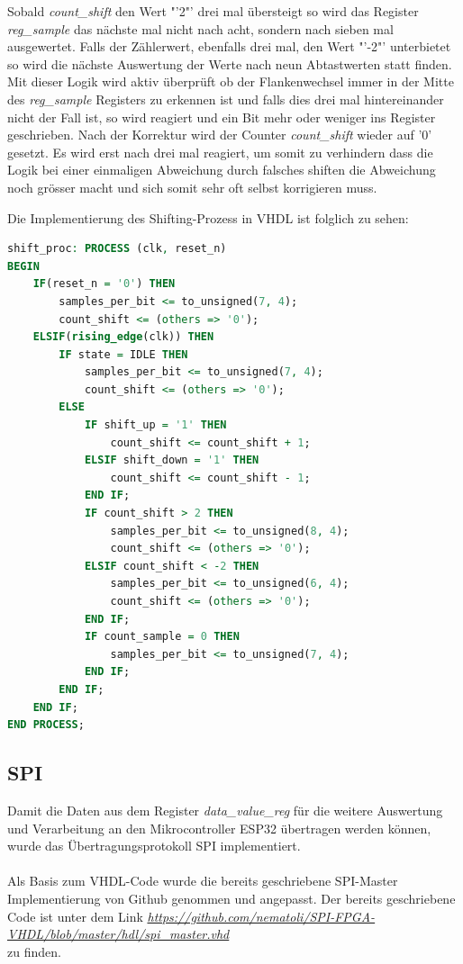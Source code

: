 Sobald \textit{count\_shift} den Wert "'2"' drei mal übersteigt so wird das Register \textit{reg\_sample} das nächste mal nicht nach acht, sondern nach sieben mal ausgewertet. Falls der Zählerwert, ebenfalls drei mal, den Wert "'-2"' unterbietet so wird die nächste Auswertung der Werte nach neun Abtastwerten statt finden. Mit dieser Logik wird aktiv überprüft ob der Flankenwechsel immer in der Mitte des \textit{reg\_sample} Registers zu erkennen ist und falls dies drei mal hintereinander nicht der Fall ist, so wird reagiert und ein Bit mehr oder weniger ins Register geschrieben.
Nach der Korrektur wird der Counter \textit{count\_shift} wieder auf '0' gesetzt. Es wird
erst nach drei mal reagiert, um somit zu verhindern dass die Logik bei einer einmaligen 
Abweichung durch falsches shiften die Abweichung noch grösser macht und sich somit sehr oft
selbst korrigieren muss.

\newpage
Die Implementierung des Shifting-Prozess in VHDL ist folglich zu sehen:

\begin{lstlisting}[language=vhdl]
shift_proc: PROCESS (clk, reset_n)
BEGIN		
	IF(reset_n = '0') THEN
		samples_per_bit <= to_unsigned(7, 4);
		count_shift <= (others => '0');
	ELSIF(rising_edge(clk)) THEN
		IF state = IDLE THEN
			samples_per_bit <= to_unsigned(7, 4);
			count_shift <= (others => '0');
		ELSE	
			IF shift_up = '1' THEN
				count_shift <= count_shift + 1;
			ELSIF shift_down = '1' THEN
				count_shift <= count_shift - 1;
			END IF;
			IF count_shift > 2 THEN
				samples_per_bit <= to_unsigned(8, 4);
				count_shift <= (others => '0');
			ELSIF count_shift < -2 THEN
				samples_per_bit <= to_unsigned(6, 4);
				count_shift <= (others => '0');
			END IF;
			IF count_sample = 0 THEN
				samples_per_bit <= to_unsigned(7, 4);
			END IF;	
		END IF;
	END IF;
END PROCESS;
\end{lstlisting}

\subsection{SPI}
\label{fpga:spi}
Damit die Daten aus dem Register \textit{data\_value\_reg} für die weitere Auswertung und Verarbeitung an den Mikrocontroller ESP32 übertragen werden können, wurde das Übertragungsprotokoll SPI implementiert.\\
\\
Als Basis zum VHDL-Code wurde die bereits geschriebene SPI-Master Implementierung von Github genommen und angepasst.
Der bereits geschriebene Code ist unter dem Link \href{https://github.com/nematoli/SPI-FPGA-VHDL/blob/master/hdl/spi_master.vhd}{\textit{https://github.com/nematoli/SPI-FPGA-VHDL/blob/master/hdl/spi\_master.vhd}} \\zu finden.


